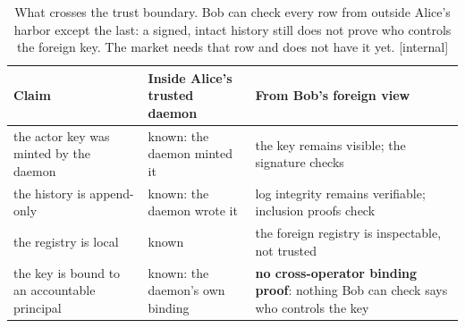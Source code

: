 \begin{table}[H]
\centering
\caption{What crosses the trust boundary. Bob can check every row from outside Alice's harbor except the last: a signed, intact history still does not prove who controls the foreign key. The market needs that row and does not have it yet. [internal]}
\label{tab:keystone-split}
\small
\renewcommand{\arraystretch}{1.15}
\begin{tabularx}{\linewidth}{@{}>{\raggedright\arraybackslash}X >{\raggedright\arraybackslash}X >{\raggedright\arraybackslash}X@{}}
\toprule
\textbf{Claim} & \textbf{Inside Alice's trusted daemon} & \textbf{From Bob's foreign view} \\
\midrule
the actor key was minted by the daemon & known: the daemon minted it & the key remains visible; the signature checks \\
the history is append-only & known: the daemon wrote it & log integrity remains verifiable; inclusion proofs check \\
the registry is local & known & the foreign registry is inspectable, not trusted \\
the key is bound to an accountable principal & known: the daemon's own binding & \textbf{no cross-operator binding proof}: nothing Bob can check says who controls the key \\
\bottomrule
\end{tabularx}
\end{table}
